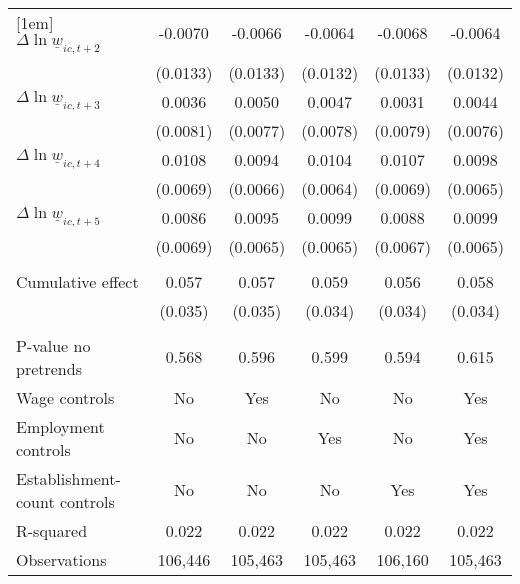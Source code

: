 {\begin{tabular}{l*{5}{c}}
[1em]
$\Delta \ln \underline{w}_{ic,t+2}$&  -0.0070         &  -0.0066         &  -0.0064         &  -0.0068         &  -0.0064         \\
          & (0.0133)         & (0.0133)         & (0.0132)         & (0.0133)         & (0.0132)         \\
[1em]
$\Delta \ln \underline{w}_{ic,t+3}$&   0.0036         &   0.0050         &   0.0047         &   0.0031         &   0.0044         \\
          & (0.0081)         & (0.0077)         & (0.0078)         & (0.0079)         & (0.0076)         \\
[1em]
$\Delta \ln \underline{w}_{ic,t+4}$&   0.0108         &   0.0094         &   0.0104         &   0.0107         &   0.0098         \\
          & (0.0069)         & (0.0066)         & (0.0064)         & (0.0069)         & (0.0065)         \\
[1em]
$\Delta \ln \underline{w}_{ic,t+5}$&   0.0086         &   0.0095         &   0.0099         &   0.0088         &   0.0099         \\
          & (0.0069)         & (0.0065)         & (0.0065)         & (0.0067)         & (0.0065)         \\
\hline
\vspace{-2mm}&                  &                  &                  &                  &                  \\
Cumulative effect&    0.057         &0.057\sym{*}         &0.059\sym{*}         &    0.056         &0.058\sym{*}         \\
          &  (0.035)         &  (0.035)         &  (0.034)         &  (0.034)         &  (0.034)         \\
\hline    &                  &                  &                  &                  &                  \\
P-value no pretrends&    0.568         &    0.596         &    0.599         &    0.594         &    0.615         \\
Wage controls&       No         &      Yes         &       No         &       No         &      Yes         \\
Employment controls&       No         &       No         &      Yes         &       No         &      Yes         \\
Establishment-count controls&       No         &       No         &       No         &      Yes         &      Yes         \\
R-squared &    0.022         &    0.022         &    0.022         &    0.022         &    0.022         \\
Observations&  106,446         &  105,463         &  105,463         &  106,160         &  105,463         \\
\hline\hline
\end{tabular}
}
